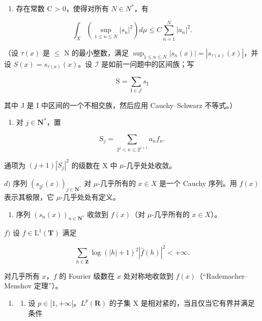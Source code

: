 \begin{enumerate}
\def\labelenumi{\alph{enumi})}
\setcounter{enumi}{1}
\tightlist
\item
  存在常数 C \textgreater{} 0，使得对所有 \(N \in N^{*}\)，有
\end{enumerate}

\[
\int_ {X} \left(\sup _ {1 \leqslant n \leqslant N} | s _ {n} | ^ {2}\right) d \mu \leqslant C \sum_ {n = 1} ^ {N} | a _ {n} | ^ {2}.
\]

（设 \(\tau(x)\) 是 \(\leqslant\) N 的最小整数，满足 \(\sup_{1\leqslant n\leqslant N}|s_n(x)| = |s_{\tau(x)}(x)|\)，并设 \(S(x) = s_{\tau(x)}(x)\)。设 \(\mathcal{I}\) 是如前一问题中的区间族；写

\[
\mathrm{S} = \sum_ {\mathrm{I} \in \mathcal {J}} s _ {\mathrm{I}}
\]

其中 J 是 I 中区间的一个不相交族，然后应用 Cauchy–Schwarz 不等式。）

\begin{enumerate}
\def\labelenumi{\alph{enumi})}
\setcounter{enumi}{2}
\tightlist
\item
  对 \(j\in \mathbf{N}^*\)，置
\end{enumerate}

\[
\mathrm{S} _ {j} = \sum_ {2 ^ {j} <   n \leqslant 2 ^ {j + 1}} a _ {n} f _ {n}.
\]

通项为 \((j+1)|S_{j}|^{2}\) 的级数在 X 中 \(\mu\)-几乎处处收敛。

\(d)\) 序列 \((s_{2^j}(x))_{j\in \mathbf{N}^*}\) 对 \(\mu\)-几乎所有的 \(x\in X\) 是一个 Cauchy 序列。用 \(f(x)\) 表示其极限，它 \(\mu\)-几乎处处有定义。

\begin{enumerate}
\def\labelenumi{\alph{enumi})}
\setcounter{enumi}{4}
\tightlist
\item
  序列 \((s_n(x))_{n\in \mathbf{N}^*}\) 收敛到 \(f(x)\)（对 \(\mu\)-几乎所有的 \(x\in X\)）。
\end{enumerate}

\(f)\) 设 \(f\in \mathrm{L}^1 (\mathbf{T})\) 满足

\[
\sum_ {h \in \mathbf {Z}} \log (| h | + 1) ^ {2} | \widehat {f} (h) | ^ {2} <   + \infty .
\]

对几乎所有 \(x\)，\(f\) 的 Fourier 级数在 \(x\) 处对称地收敛到 \(f(x)\)（“Rademacher–Menshov 定理”）。

\begin{enumerate}
\def\labelenumi{\arabic{enumi})}
\setcounter{enumi}{47}
\tightlist
\item
  \begin{enumerate}
  \def\labelenumii{\alph{enumii})}
  \tightlist
  \item
    设 \(p \in [1, +\infty[\)。\(L^p(\mathbf{R})\) 的子集 X 是相对紧的，当且仅当它有界并满足条件
  \end{enumerate}
\end{enumerate}

